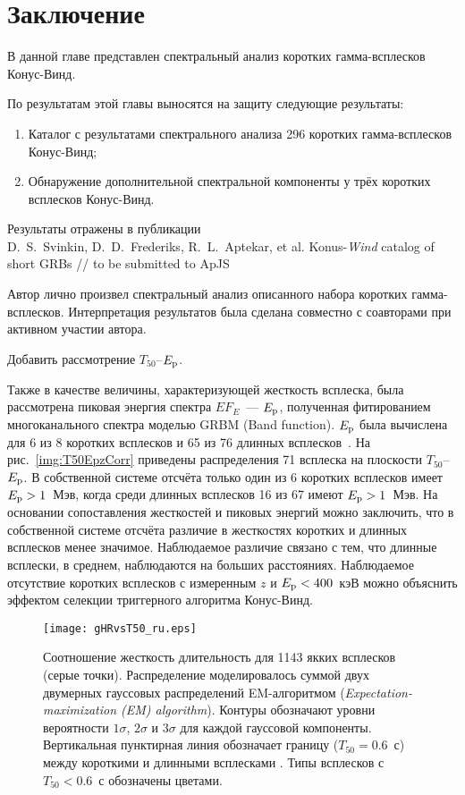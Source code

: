 \section{Заключение}
В данной главе представлен спектральный анализ коротких гамма-всплесков Конус-Винд.

По результатам этой главы выносятся на защиту следующие результаты:
\begin{enumerate}
\item Каталог с результатами спектрального анализа 296 коротких гамма-всплесков Конус-Винд;
\item Обнаружение дополнительной спектральной компоненты у трёх коротких всплесков Конус-Винд.
\end{enumerate}

Результаты отражены в публикации \\
D.~S.~Svinkin, D.~D.~Frederiks, R.~L.~Aptekar, et al. Konus-\textit{Wind} catalog of short GRBs //
to be submitted to ApJS

Автор лично произвел спектральный анализ описанного набора коротких гамма-всплесков.
Интерпретация результатов была сделана совместно с соавторами при активном участии автора.

\clearpage
Добавить рассмотрение $T_{50}$--$E_{\mathrm{p}}$.

Также в качестве величины, характеризующей жесткость всплеска, была рассмотрена 
пиковая энергия спектра $E F_E$~--- $E_{\mathrm{p}}$, полученная фитированием многоканального 
спектра моделью GRBM (Band function). $E_{{\mathrm{p}}}$ была вычислена для 6 из 8 коротких 
всплесков и 65 из 76 длинных всплесков~\citep{Tsvetkova_KW_GRBs_with_z}. На рис.~\ref{img:T50EpzCorr} 
приведены распределения 71 всплеска на плоскости $T_{50}$--$E_{\mathrm{p}}$. В собственной системе 
отсчёта только один из 6 коротких всплесков имеет $E_{\mathrm{p}} > 1$~Мэв, когда среди длинных 
всплесков 16 из 67 имеют $E_{\mathrm{p}} > 1$~Мэв. На основании сопоставления жесткостей 
и пиковых энергий можно заключить, что в собственной системе отсчёта 
различие в жесткостях коротких и длинных всплесков менее значимое. Наблюдаемое 
различие связано с тем, что длинные всплески, в среднем, наблюдаются на больших 
расстояниях. Наблюдаемое отсутствие коротких всплесков с измеренным $z$ 
и $E_{{\mathrm{p}}} <400$~кэВ можно объяснить эффектом селекции триггерного алгоритма Конус-Винд. 


\clearpage

\begin{figure}
    \begin{center}
        \texttt{[image: gHRvsT50\_ru.eps]}
    \end{center}
    \caption{
    Соотношение жесткость длительность для 1143 якких всплесков \kws (серые точки).
    Распределение моделировалось суммой двух двумерных гауссовых распределений
    EM-алгоритмом (\textit{Expectation-maximization (EM) algorithm}). 
    Контуры обозначают уровни вероятности $1\sigma$, $2\sigma$ и $3\sigma$ для каждой
    гауссовой компоненты. Вертикальная пунктирная линия обозначает границу ($T_{50}=0.6$~с)
    между короткими и длинными всплесками \kws. Типы всплесков с $T_{50}<0.6$~с 
    обозначены цветами.
    \label{fig:HRvsT50}}
\end{figure}

